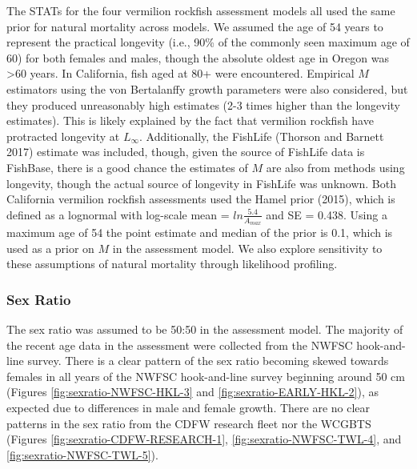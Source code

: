 \documentclass[11pt,
  english,
]{article}
\begin{document}
The STATs for the four vermilion rockfish assessment models all used the same prior for natural mortality across models. We assumed the age of 54 years to represent the practical longevity (i.e., 90\% of the commonly seen maximum age of 60) for both females and males, though the absolute oldest age in Oregon was \textgreater60 years. In California, fish aged at 80+ were encountered. Empirical {\(M\)\leavevmode\tagmcend\tagstructend} estimators using the von Bertalanffy growth parameters were also considered, but they produced unreasonably high estimates (2-3 times higher than the longevity estimates). This is likely explained by the fact that vermilion rockfish have protracted longevity at {\(L_{\infty}\)\leavevmode\tagmcend\tagstructend}. Additionally, the FishLife {(Thorson and Barnett 2017)\leavevmode\tagmcend\tagstructend} estimate was included, though, given the source of FishLife data is FishBase, there is a good chance the estimates of {\(M\)\leavevmode\tagmcend\tagstructend} are also from methods using longevity, though the actual source of longevity in FishLife was unknown. Both California vermilion rockfish assessments used the Hamel prior {(2015)\leavevmode\tagmcend\tagstructend}, which is defined as a lognormal with log-scale mean = {\(ln\frac{5.4}{A_{max}}\)\leavevmode\tagmcend\tagstructend} and SE = 0.438. Using a maximum age of 54 the point estimate and median of the prior is 0.1, which is used as a prior on {\(M\)\leavevmode\tagmcend\tagstructend} in the assessment model. We also explore sensitivity to these assumptions of natural mortality through likelihood profiling.


\hypertarget{sex-ratio}{%
\subsubsection{Sex Ratio}\label{sex-ratio}}

\leavevmode\tagmcend\tagstructend

The sex ratio was assumed to be 50:50 in the assessment model. The majority of the recent age data in the assessment were collected from the NWFSC hook-and-line survey. There is a clear pattern of the sex ratio becoming skewed towards females in all years of the NWFSC hook-and-line survey beginning around 50 cm (Figures \ref{fig:sexratio-NWFSC-HKL-3} and \ref{fig:sexratio-EARLY-HKL-2}), as expected due to differences in male and female growth. There are no clear patterns in the sex ratio from the CDFW research fleet nor the WCGBTS (Figures \ref{fig:sexratio-CDFW-RESEARCH-1}, \ref{fig:sexratio-NWFSC-TWL-4}, and \ref{fig:sexratio-NWFSC-TWL-5}).
\end{document}
